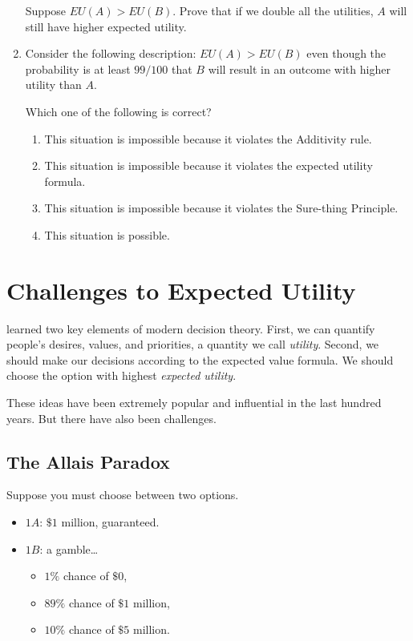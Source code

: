 \documentclass[justified]{tufte-book}
\providecommand{\tightlist}{%
  \setlength{\itemsep}{0pt}\setlength{\parskip}{0pt}}
\theoremstyle{definition}
\theoremstyle{definition}
\theoremstyle{definition}
\theoremstyle{definition}
\theoremstyle{remark}
\begin{document}
\begin{enumerate}
  Suppose \(EU(A) > EU(B)\). Prove that if we double all the utilities, \(A\) will still have higher expected utility.
\item
  Consider the following description: \(EU(A) > EU(B)\) even though the probability is at least \(99/100\) that \(B\) will result in an outcome with higher utility than \(A\).

  Which one of the following is correct?

  \begin{enumerate}
  \def\labelenumii{\alph{enumii}.}
  \tightlist
  \item
    This situation is impossible because it violates the Additivity rule.
  \item
    This situation is impossible because it violates the expected utility formula.
  \item
    This situation is impossible because it violates the Sure-thing Principle.
  \item
    This situation is possible.
  \end{enumerate}
\end{enumerate}

\hypertarget{challenges-to-expected-utility}{%
\chapter{Challenges to Expected Utility}\label{challenges-to-expected-utility}}

 learned two key elements of modern decision theory. First, we can quantify people's desires, values, and priorities, a quantity we call \emph{utility}. Second, we should make our decisions according to the expected value formula. We should choose the option with highest \emph{expected utility}.

These ideas have been extremely popular and influential in the last hundred years. But there have also been challenges.

\hypertarget{the-allais-paradox}{%
\section{The Allais Paradox}\label{the-allais-paradox}}

Suppose you must choose between two options.

\begin{itemize}
\tightlist
\item
  \(1A\): \(\$1\) million, guaranteed.
\item
  \(1B\): a gamble\ldots{}

  \begin{itemize}
  \tightlist
  \item
    \(1\%\) chance of \(\$0\),
  \item
    \(89\%\) chance of \(\$1\) million,
  \item
    \(10\%\) chance of \(\$5\) million.
  \end{itemize}
\end{itemize}
\end{document}
